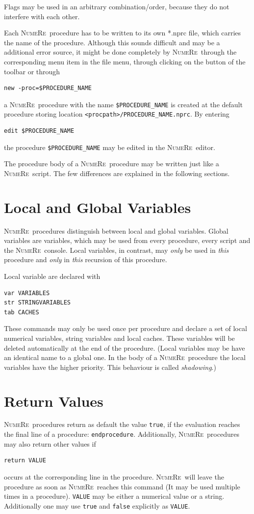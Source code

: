 \documentclass[DIV=14,headsepline,footsepline]{scrbook}
\newcommand{\NR}{\textsc{Nu\-me\-Re}}
\begin{document}
				Flags may be used in an arbitrary combination/order, because they do not interfere with each other.
				
				Each \NR\ procedure has to be written to its own *.nprc file, which carries the name of the procedure. Although this sounds difficult and may be a additional error source, it might be done completely by \NR\ through the corresponding menu item in the file menu, through clicking on the button of the toolbar or through
				\begin{lstlisting}
new -proc=$PROCEDURE_NAME
				\end{lstlisting}
				a \NR\ procedure with the name \lstinline+$PROCEDURE_NAME+ is created at the default procedure storing location \verb+<procpath>/PROCEDURE_NAME.nprc+. By entering 
				\begin{lstlisting}
edit $PROCEDURE_NAME
				\end{lstlisting}
				the procedure \lstinline+$PROCEDURE_NAME+ may be edited in the \NR\ editor.
				
				The procedure body of a \NR\ procedure may be written just like a \NR\ script. The few differences are explained in the following sections.
			\section{Local and Global Variables}
				\NR\ procedures distinguish between local and global variables. Global variables are variables, which may be used from every procedure, every script and the \NR\ console. Local variables, in contrast, may \emph{only} be used in \emph{this} procedure and \emph{only} in \emph{this} recursion of this procedure.
				
				Local variable are declared with
				\begin{lstlisting}
var VARIABLES
str STRINGVARIABLES
tab CACHES
				\end{lstlisting}
				These commands may only be used once per procedure and declare a set of local numerical variables, string variables and local caches. These variables will be deleted automatically at the end of the procedure. (Local variables may be have an identical name to a global one. In the body of a \NR\ procedure the local variables have the higher priority. This behaviour is called \emph{shadowing}.)
			\section{Return Values}
				\NR\ procedures return as default the value \lstinline+true+, if the evaluation reaches the final line of a procedure: \lstinline+endprocedure+. Additionally, \NR\ procedures may also return other values if
				\begin{lstlisting}
return VALUE
				\end{lstlisting}
				occurs at the corresponding line in the procedure. \NR\ will leave the procedure as soon as \NR\ reaches this command (It may be used multiple times in a procedure). \lstinline+VALUE+ may be either a numerical value or a string. Additionally one may use \lstinline+true+ and \lstinline+false+ explicitly as \lstinline+VALUE+.
				
\end{document}
